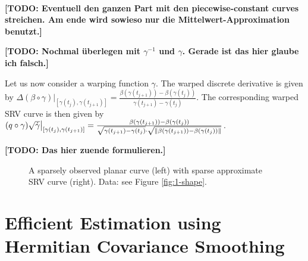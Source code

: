 \paragraph{} 
\textbf{[TODO: Eventuell den ganzen Part mit den piecewise-constant curves streichen. Am ende wird sowieso nur die Mittelwert-Approximation benutzt.]}

\textbf{[TODO: Nochmal überlegen mit $\gamma^{-1}$ und $\gamma$. Gerade ist das hier glaube ich falsch.]}

Let us now consider a warping function $\gamma$.
The warped discrete derivative is given by $\Delta (\beta \circ \gamma) \big\rvert_{[\gamma(t_j), \gamma(t_{j+1})]} = \frac{\beta(\gamma(t_{j+1})) - \beta(\gamma(t_{j}))}{\gamma(t_{j+1}) - \gamma(t_j)}$.
The corresponding warped SRV curve is then given by  $(q \circ \gamma) \sqrt{\dot\gamma} \big\rvert_{[\gamma(t_j), \gamma(t_{j+1})]} = \frac{\beta(\gamma(t_{j+1})) - \beta(\gamma(t_j))}{\sqrt{\gamma(t_{j+1}) - \gamma(t_j)} \cdot \sqrt{\lVert\beta(\gamma(t_{j+1})) - \beta(\gamma(t_j))\rVert}}$.

\textbf{[TODO: Das hier zuende formulieren.]}

\begin{figure}
  \centering
  \begin{subfigure}{.48\textwidth}
    \centering
  \end{subfigure}\hfill%
  \begin{subfigure}{.48\textwidth}
    \centering
  \end{subfigure}
  \caption{A sparsely observed planar curve (left) with sparse approximate SRV curve (right). Data: see Figure \ref{fig:1-shape}.}
  \label{fig:3-disc}
\end{figure}



\section{Efficient Estimation using Hermitian Covariance Smoothing}
\label{sec:3-cov}

